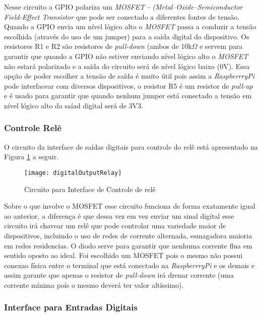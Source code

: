 		Nesse circuito a GPIO polariza um \textit{MOSFET - (Metal–Oxide–Semiconductor Field-Effect Transistor} que pode ser conectado a diferentes fontes de tensão. Quando a GPIO envia um nível lógico alto o \textit{MOSFET} passa a conduzir a tensão escolhida (através do uso de um jumper) para a saída digital do dispositivo. Os resistores R1 e R2 são resistores de \textit{pull-down} (ambos de 10k$\Omega$ e servem para garantir que quando a GPIO não estiver enviando nível lógico alto o \textit{MOSFET} não estará polarizado e a saída do circuito será de nível lógico baixo (0V). Essa opção de poder escolher a tensão de saída é muito útil pois assim a \textit{RaspberrryPi} pode interfacear com diversos dispositivos, o resistor R5 é um resistor de \textit{pull-up} e é usado para garantir que quando nenhum jumper está conectado a tensão em nível lógico alto da saíad digital será de 3V3. 
	
	\subsubsection{Controle Relê}
	
	O circuito da interface de saídas digitais para controle do relê está apresentado na Figura \ref{fig-digitalOutputRelay} a seguir.
	
	\begin{figure}[htbp]
		\centering
			\texttt{[image: digitalOutputRelay]}
		\caption{Circuito para Interface de Controle de relê}
		\label{fig-digitalOutputRelay}
	\end{figure}
	
	Sobre o que involve o MOSFET esse circuito funciona de forma exatamente igual ao anterior, a diferença é que dessa vez em vez enviar um sinal digital esse circuito irá chavear um relê que pode controlar uma variedade maior de dispositivos, incluindo o uso de redes de corrente alternada, esmagadora maioria em redes residencias. O diodo serve para garantir que nenhuma corrente flua em sentido oposto ao ideal. Foi escolhido um MOSFET pois o mesmo não possui conexao física entre o terminal que está conectado na \textit{RaspberrryPi} e os demais e assim garante que apenas o resistor de \textit{pull-down} irá drenar corrente (uma corrente mínima poís o mesmo deverá ter valor altíssimo).

	\subsubsection{Interface para Entradas Digitais}

